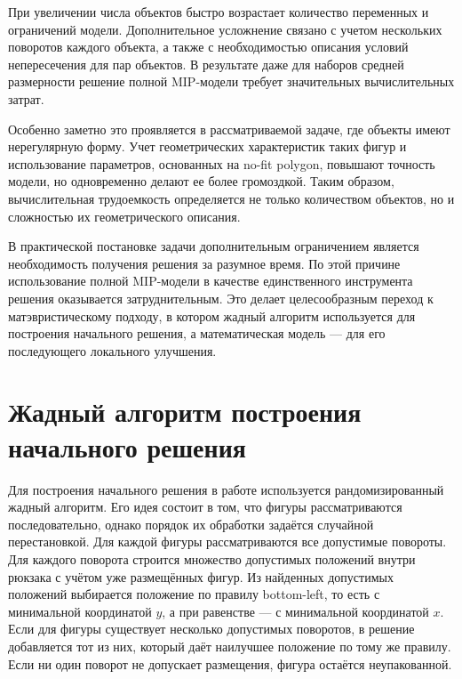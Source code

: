 \documentclass[a4paper]{article}
\begin{document}
    При увеличении числа объектов быстро возрастает количество переменных и ограничений модели. Дополнительное усложнение связано с учетом нескольких поворотов каждого объекта, а также с необходимостью описания условий непересечения для пар объектов. В результате даже для наборов средней размерности решение полной MIP-модели требует значительных вычислительных затрат.
    
    Особенно заметно это проявляется в рассматриваемой задаче, где объекты имеют нерегулярную форму. Учет геометрических характеристик таких фигур и использование параметров, основанных на no-fit polygon, повышают точность модели, но одновременно делают ее более громоздкой. Таким образом, вычислительная трудоемкость определяется не только количеством объектов, но и сложностью их геометрического описания.
    
    В практической постановке задачи дополнительным ограничением является необходимость получения решения за разумное время. По этой причине использование полной MIP-модели в качестве единственного инструмента решения оказывается затруднительным. Это делает целесообразным переход к матэвристическому подходу, в котором жадный алгоритм используется для построения начального решения, а математическая модель — для его последующего локального улучшения.
    
    \newpage    
	\section{Жадный алгоритм построения начального решения}
    
    Для построения начального решения в работе используется рандомизированный жадный алгоритм.
    Его идея состоит в том, что фигуры рассматриваются последовательно, однако порядок их
    обработки задаётся случайной перестановкой. Для каждой фигуры рассматриваются все допустимые
    повороты. Для каждого поворота строится множество допустимых положений внутри рюкзака с
    учётом уже размещённых фигур. Из найденных допустимых положений выбирается положение по
    правилу bottom-left, то есть с минимальной координатой $y$, а при равенстве --- с
    минимальной координатой $x$. Если для фигуры существует несколько допустимых поворотов,
    в решение добавляется тот из них, который даёт наилучшее положение по тому же правилу.
    Если ни один поворот не допускает размещения, фигура остаётся неупакованной.
\end{document}
